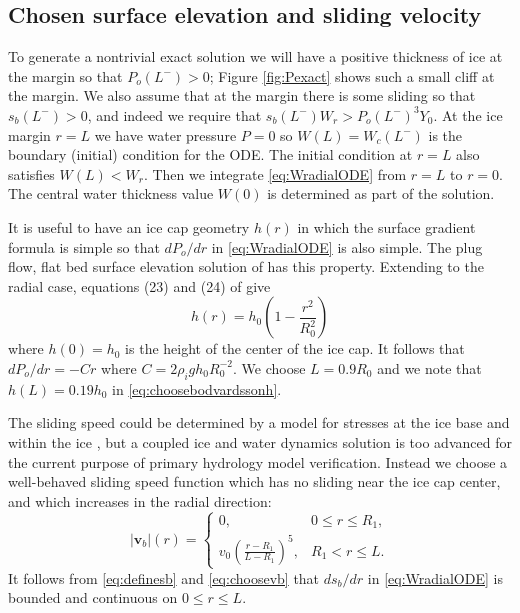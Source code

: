 \documentclass[11pt,final]{amsart}
\newcommand\bv{\mathbf{v}}
\begin{document}
\subsection*{Chosen surface elevation and sliding velocity}  To generate a nontrivial exact solution we will have a positive thickness of ice at the margin so that $P_o(L^-)>0$; Figure \ref{fig:Pexact} shows such a small cliff at the margin.  We also assume that at the margin there is some sliding so that $s_b(L^-)>0$, and indeed we require that $s_b(L^-) W_r > P_o(L^-)^3 Y_0$.  At the ice margin $r=L$ we have water pressure $P=0$ so $W(L)=W_c(L^-)$ is the boundary (initial) condition for the ODE.  The initial condition at $r=L$ also satisfies $W(L) < W_r$.  Then we integrate \eqref{eq:WradialODE} from $r=L$ to $r=0$.  The central water thickness value $W(0)$ is determined as part of the solution.

It is useful to have an ice cap geometry $h(r)$ in which the surface gradient formula is simple so that $dP_o/dr$ in \eqref{eq:WradialODE} is also simple.  The plug flow, flat bed surface elevation solution of \cite{Bodvardsson} has this property.  Extending to the radial case, equations (23) and (24) of \citep{Bodvardsson} give
\begin{equation}
h(r) = h_0 \left(1 - \frac{r^2}{R_0^2} \right) \label{eq:choosebodvardssonh}
\end{equation}
where $h(0)=h_0$ is the height of the center of the ice cap.  It follows that $dP_o/dr = - C r$ where $C=2\rho_i g h_0 R_0^{-2}$.  We choose $L=0.9 R_0$ and we note that $h(L)=0.19 h_0$ in \eqref{eq:choosebodvardssonh}.

The sliding speed could be determined by a model for stresses at the ice base and within the ice \citep{GreveBlatter2009}, but a coupled ice and water dynamics solution is too advanced for the current purpose of primary hydrology model verification.  Instead we choose a well-behaved sliding speed function which has no sliding near the ice cap center, and which increases in the radial direction:
\begin{equation}
|\bv_b|(r) = \begin{cases} 0, & 0 \le r \le R_1, \\
                           v_0  \left(\frac{r-R_1}{L-R_1}\right)^5, & R_1 < r \le L.
             \end{cases}  \label{eq:choosevb}
\end{equation}
It follows from \eqref{eq:definesb} and \eqref{eq:choosevb} that $ds_b/dr$ in \eqref{eq:WradialODE} is bounded and continuous on $0\le r \le L$.
\end{document}
